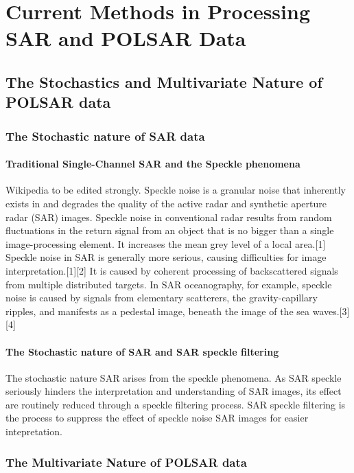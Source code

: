 \chapter{Current Methods in Processing SAR and POLSAR Data} %

\section{The Stochastics and Multivariate Nature of POLSAR data}

\subsection{The Stochastic nature of SAR data}

\subsubsection{ Traditional Single-Channel SAR and the Speckle phenomena} 

Wikipedia to be edited strongly.
Speckle noise is a granular noise that inherently exists in and degrades the quality of the active radar and synthetic aperture radar (SAR) images.
Speckle noise in conventional radar results from random fluctuations in the return signal from an object that is no bigger than a single image-processing element. It increases the mean grey level of a local area.[1]
Speckle noise in SAR is generally more serious, causing difficulties for image interpretation.[1][2] It is caused by coherent processing of backscattered signals from multiple distributed targets. In SAR oceanography, for example, speckle noise is caused by signals from elementary scatterers, the gravity-capillary ripples, and manifests as a pedestal image, beneath the image of the sea waves.[3][4]

\subsubsection{The Stochastic nature of SAR  and SAR speckle filtering }

The stochastic nature SAR arises from the speckle phenomena.
As SAR speckle seriously hinders the interpretation and understanding of SAR images,
  its effect are routinely reduced through a speckle filtering process.
SAR speckle filtering is the process to suppress the effect of speckle noise SAR images for easier intepretation.

\subsection{The Multivariate Nature of POLSAR data}

